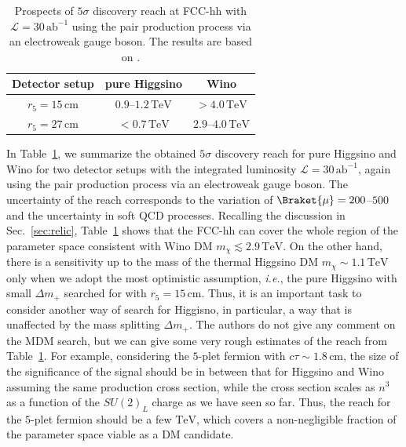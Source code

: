 \documentclass[12pt,twoside,book]{article}
\begin{document}
\begin{table}[t]
  \centering
  \begin{tabular}{c|cc}
    Detector setup & pure Higgsino & Wino \\ \hline
    $r_5 = 15\,\mathrm{cm}$ & $0.9$--$1.2\,\mathrm{TeV}$ & $> 4.0\,\mathrm{TeV}$ \\
    $r_5 = 27\,\mathrm{cm}$ & $<0.7\,\mathrm{TeV}$ & $2.9$--$4.0\,\mathrm{TeV}$
  \end{tabular}
  \caption{
    Prospects of $5\sigma$ discovery reach at FCC-hh with $\mathcal{L} = 30\,\mathrm{ab}^{-1}$  using the pair production process via an electroweak gauge boson.
    The results are based on \cite{Saito:2019rtg}.
  }
  \label{tab:disp_track_future}
\end{table}

In Table~\ref{tab:disp_track_future}, we summarize the obtained $5\sigma$ discovery reach for pure Higgsino and Wino for two detector setups with the integrated luminosity $\mathcal{L} = 30\,\mathrm{ab}^{-1}$, again using the pair production process via an electroweak gauge boson.
The uncertainty of the reach corresponds to the variation of $\Braket{\mu}=200$--$500$ and the uncertainty in soft QCD processes.
Recalling the discussion in Sec.~\ref{sec:relic}, Table~\ref{tab:disp_track_future} shows that the FCC-hh can cover the whole region of the parameter space consistent with Wino DM $m_\chi \lesssim 2.9\,\mathrm{TeV}$.
On the other hand, there is a sensitivity up to the mass of the thermal Higgsino DM $m_\chi \sim 1.1\,\mathrm{TeV}$ only when we adopt the most optimistic assumption, \textit{i.e.}, the pure Higgsino with small $\Delta m_{+}$ searched for with $r_5 = 15\,\mathrm{cm}$.
Thus, it is an important task to consider another way of search for Higgisno, in particular, a way that is unaffected by the mass splitting $\Delta m_{+}$.
The authors do not give any comment on the MDM search, but we can give some very rough estimates of the reach from Table~\ref{tab:disp_track_future}.
For example, considering the $5$-plet fermion with $c\tau \sim 1.8\,\mathrm{cm}$, the size of the significance of the signal should be in between that for Higgsino and Wino assuming the same production cross section, while the cross section scales as $n^3$ as a function of the $SU(2)_L$ charge as we have seen so far.
Thus, the reach for the $5$-plet fermion should be a few $\mathrm{TeV}$, which covers a non-negligible fraction of the parameter space viable as a DM candidate.


\end{document}
